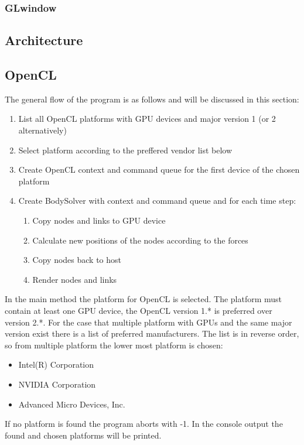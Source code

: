 \documentclass[11pt,a4paper]{scrartcl}
\begin{document}
\subsubsection{GLwindow}



\subsection{Architecture}

\subsection{OpenCL}
The general flow of the program is as follows and will be discussed in this section:
\begin{enumerate}
	\item List all OpenCL platforms with GPU devices and major version 1 (or 2 alternatively)
	\item Select platform according to the preffered vendor list below
	\item Create OpenCL context and command queue for the first device of the chosen platform
	\item Create BodySolver with context and command queue and for each time step:
	\begin{enumerate}
		\item Copy nodes and links to GPU device
		\item Calculate new positions of the nodes according to the forces
		\item Copy nodes back to host
		\item Render nodes and links
	\end{enumerate}
\end{enumerate}

In the main method the platform for OpenCL is selected. The platform must contain at least one GPU device, the OpenCL version 1.* is preferred over version 2.*. For the case that multiple platform with GPUs and the same major version exist there is a list of preferred manufacturers. The list is in reverse order, so from multiple platform the lower most platform is chosen:
\begin{itemize}
	\item Intel(R) Corporation
	\item NVIDIA Corporation
	\item Advanced Micro Devices, Inc.
\end{itemize}
If no platform is found the program aborts with -1. In the console output the found and chosen platforms will be printed.
\end{document}
